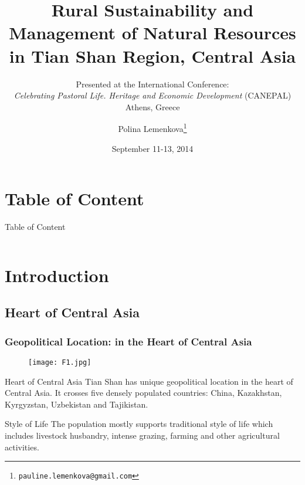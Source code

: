 \documentclass[pdflatex,compress,8pt,
	xcolor={dvipsnames,dvipsnames,svgnames,x11names,table},
	hyperref={colorlinks = true,
	breaklinks = true, 
	urlcolor = NavyBlue, 
	breaklinks = true}]{beamer}
\title[Rural Sustainability and Management of Natural Resources in Tian Shan Region, Central Asia. 11/09/2014]{Rural Sustainability and Management of Natural Resources\\
in Tian Shan Region, Central Asia}
\subtitle{
	Presented at the International Conference: \\
	\emph{Celebrating Pastoral Life. Heritage and Economic Development} (CANEPAL)\\
	Athens, Greece}
\author[Polina Lemenkova]{Polina Lemenkova\footnote{\tiny{\texttt{pauline.lemenkova@gmail.com}}}}
\date{September 11-13, 2014}
\begin{document}
\begin{frame}
  \maketitle
\end{frame}

\section*{Table of Content}
\begin{frame}{Table of Content}
    \begin{columns}[onlytextwidth,T]
        \begin{column}{.5\textwidth}
            \footnotesize{\tableofcontents[sections=1-4]}
        \end{column}
        \begin{column}{.5\textwidth}
            \footnotesize{\tableofcontents[sections=5-14]}
        \end{column}
    \end{columns}
\end{frame}

\section{Introduction}
\subsection{Heart of Central Asia}
\begin{frame}\frametitle{Geopolitical Location: in the Heart of Central Asia}

\begin{figure}[H]
	\centering
		\texttt{[image: F1.jpg]}
\end{figure}

\begin{alertblock}{Heart of Central Asia}
Tian Shan has unique geopolitical location in the heart of Central Asia. It crosses five densely populated countries: China, Kazakhstan, Kyrgyzstan, Uzbekistan and Tajikistan.
\end{alertblock}

\begin{block}{Style of Life}
The population mostly supports traditional style of life which includes livestock husbandry, intense grazing, farming and other agricultural activities.
\end{block}

\end{frame}
\end{document}
